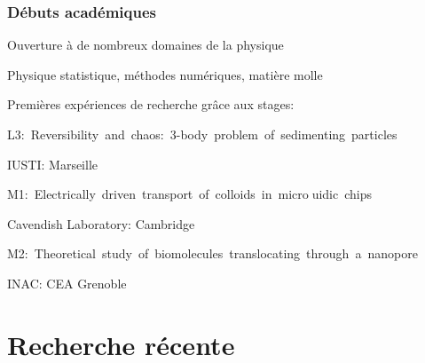 \documentclass{beamer}
\begin{document}
 \frame %
{
  \frametitle{Débuts académiques}

\begin{itemize}
\begin{center}

\item<1->  Ouverture à de nombreux domaines de la physique
\medskip
\item<2->  Physique statistique, méthodes numériques, matière molle 


\medskip
\medskip

\item<3-> Premières expériences de recherche grâce aux stages:
\medskip

\item<4-> \small{\mbox{L3: Reversibility and chaos: 3-body problem of sedimenting particles}

IUSTI: Marseille
}
\medskip


\item<4-> \small{\mbox{M1: Electrically driven transport of colloids in microuidic chips}

Cavendish Laboratory: Cambridge
}

\item<4-> \small{\mbox{M2: Theoretical study of biomolecules translocating through a nanopore}

INAC: CEA Grenoble
}


\end{center}
\end{itemize}

}

 
\section{Recherche récente}
\end{document}
